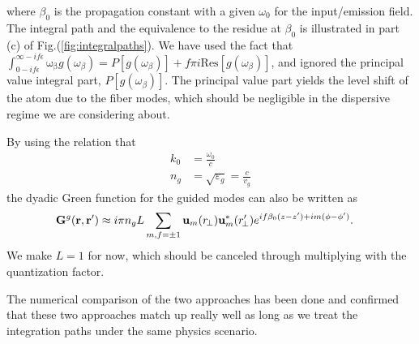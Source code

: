 where $ \beta_0 $ is the propagation constant with a given $ \omega_0 $ for the input/emission field. The integral path and the equivalence to the residue at $ \beta_0 $ is illustrated in part (c) of Fig.(\ref{fig:integralpaths}). We have used the fact that $ \int_{0-if\epsilon}^{\infty-if\epsilon} \mathrm{\omega_\beta}g(\omega_\beta) = P\left[ g(\omega_\beta)\right] +f\pi i \mathrm{Res}\left[g(\omega_\beta) \right] $, and ignored the principal value integral part, $ P\left[ g(\omega_\beta)\right] $. The principal value part yields the level shift of the atom due to the fiber modes, which should be negligible in the dispersive regime we are considering about.  

By using the relation that 
\begin{align}
k_0 &=\frac{\omega_0}{c}\\
n_g&=\sqrt{\varepsilon_g}= \frac{c}{v_g}
\end{align}
the dyadic Green function for the guided modes can also be written as
\begin{align}
\mathbf{G}^g(\mathbf{r},\mathbf{r}') &\approx i\pi n_gL\sum_{m,f=\pm 1} \mathbf{u}_{m}(r\!_\perp)\mathbf{u}^*_{m}(r_{\!\perp}^\prime)e^{if\beta_0(z-z')+im(\phi-\phi')}.
\end{align}
We make $ L=1 $ for now, which should be canceled through multiplying with the quantization factor. 
 


The numerical comparison of the two approaches has been done and confirmed that these two approaches match up really well as long as we treat the integration paths under the same physics scenario.  

